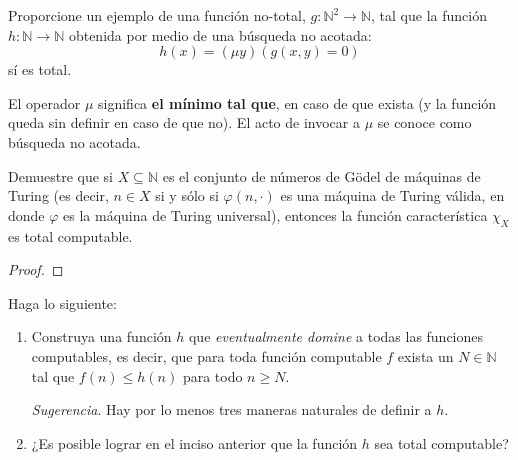 \documentclass[12pt]{report}
\newcounter{it}
\theoremstyle{largebreak}
\newcommand\cf[3]{\ensuremath{#1:#2\rightarrow#3}}
\begin{document}
    \begin{excer}
        Proporcione un ejemplo de una función no-total, $\cf{g}{\mathbb{N}^2}{\mathbb{N}}$, tal que la función $\cf{h}{\mathbb{N}}{\mathbb{N}}$ obtenida por medio de una búsqueda no acotada:
        \begin{equation*}
            h(x)=(\mu y)(g(x,y)=0)
        \end{equation*}
        sí es total.
    \end{excer}

    \begin{sol}
        
    \end{sol}

    \begin{mydef}
        El operador $\mu$ significa \textbf{el mínimo tal que}, en caso de que exista (y la función queda sin definir en caso de que no). El acto de invocar a $\mu$ se conoce como búsqueda no acotada.
    \end{mydef}

    \begin{excer}
        Demuestre que si $X\subseteq\mathbb{N}$ es el conjunto de números de Gödel de máquinas de Turing (es decir, $n\in X$ si y sólo si $\varphi(n,\cdot)$ es una máquina de Turing válida, en donde $\varphi$ es la máquina de Turing universal), entonces la función característica $\chi_X$ es total computable.
    \end{excer}

    \begin{proof}
        
    \end{proof}

    \begin{excer}
        Haga lo siguiente:
        \begin{enumerate}[label = \textit{(\alph*)}]
            \item Construya una función $h$ que \textit{eventualmente domine} a todas las funciones computables, es decir, que para toda función computable $f$ exista un $N\in\mathbb{N}$ tal que $f(n)\leq h(n)$ para todo $n\geq N$.
            
            \textit{Sugerencia}. Hay por lo menos tres maneras naturales de definir a $h$.
            \item ¿Es posible lograr en el inciso anterior que la función $h$ sea total computable?
        \end{enumerate}
    \end{excer}
\end{document}
